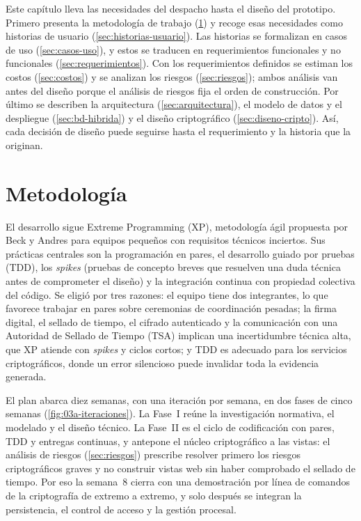 Este capítulo lleva las necesidades del despacho hasta el diseño del prototipo. Primero presenta la metodología de trabajo (\cref{sec:metodologia}) y recoge esas necesidades como historias de usuario (\cref{sec:historias-usuario}). Las historias se formalizan en casos de uso (\cref{sec:casos-uso}), y estos se traducen en requerimientos funcionales y no funcionales (\cref{sec:requerimientos}). Con los requerimientos definidos se estiman los costos (\cref{sec:costos}) y se analizan los riesgos (\cref{sec:riesgos}); ambos análisis van antes del diseño porque el análisis de riesgos fija el orden de construcción. Por último se describen la arquitectura (\cref{sec:arquitectura}), el modelo de datos y el despliegue (\cref{sec:bd-hibrida}) y el diseño criptográfico (\cref{sec:diseno-cripto}). Así, cada decisión de diseño puede seguirse hasta el requerimiento y la historia que la originan.

\section{Metodología}\label{sec:metodologia}

El desarrollo sigue Extreme Programming (XP), metodología ágil propuesta por Beck y Andres \cite{beck2004} para equipos pequeños con requisitos técnicos inciertos. Sus prácticas centrales son la programación en pares, el desarrollo guiado por pruebas (TDD), los \emph{spikes} (pruebas de concepto breves que resuelven una duda técnica antes de comprometer el diseño) y la integración continua con propiedad colectiva del código. Se eligió por tres razones: el equipo tiene dos integrantes, lo que favorece trabajar en pares sobre ceremonias de coordinación pesadas; la firma digital, el sellado de tiempo, el cifrado autenticado y la comunicación con una Autoridad de Sellado de Tiempo (TSA) implican una incertidumbre técnica alta, que XP atiende con \emph{spikes} y ciclos cortos; y TDD es adecuado para los servicios criptográficos, donde un error silencioso puede invalidar toda la evidencia generada.

El plan abarca diez semanas, con una iteración por semana, en dos fases de cinco semanas (\cref{fig:03a-iteraciones}). La Fase~I reúne la investigación normativa, el modelado y el diseño técnico. La Fase~II es el ciclo de codificación con pares, TDD y entregas continuas, y antepone el núcleo criptográfico a las vistas: el análisis de riesgos (\cref{sec:riesgos}) prescribe resolver primero los riesgos criptográficos graves y no construir vistas web sin haber comprobado el sellado de tiempo. Por eso la semana~8 cierra con una demostración por línea de comandos de la criptografía de extremo a extremo, y solo después se integran la persistencia, el control de acceso y la gestión procesal.


